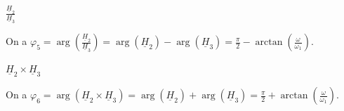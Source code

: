 

\begin{enonce}
	$\frac{\underline{H}_2}{\underline{H}_3}$
\end{enonce}


\begin{corrige}
On a $\varphi_5= \arg\left( \frac{\underline{H}_2}{\underline{H}_3} \right)= \arg\left( \underline{H}_2 \right) - \arg\left( \underline{H}_3 \right)
	= \frac{\pi}{2} - \arctan \left( \frac{\omega}{\omega_1}  \right)$.
\end{corrige}



\begin{enonce}
	$\underline{H}_2\times\underline{H}_3$
\end{enonce}


\begin{corrige}
On a $\varphi_6= \arg\left( \underline{H}_2 \times \underline{H}_3 \right)= \arg\left( \underline{H}_2 \right) + \arg\left( \underline{H}_3 \right)
	= \frac{\pi}{2} + \arctan \left( \frac{\omega}{\omega_1}  \right)$.
\end{corrige}


\finEntrainement





\hauteurLargeurCadreReponse		{6mm}{6cm}
\initialisationEntrainement

